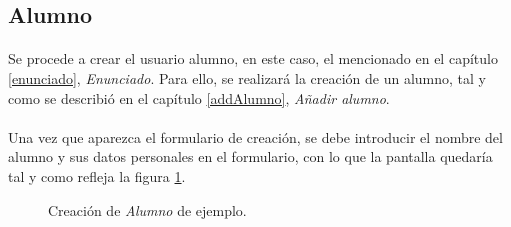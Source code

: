 \subsection{Alumno}

  \paragraph{}Se procede a crear el usuario alumno, en este caso, el mencionado
  en el capítulo \ref{enunciado}, \textit{Enunciado}. Para ello, se realizará la
  creación de un alumno, tal y como se describió en el capítulo \ref{addAlumno},
  \textit{Añadir alumno}.

  \paragraph{}Una vez que aparezca el formulario de creación, se debe introducir
  el nombre del alumno y sus datos personales en el formulario, con lo que
  la pantalla quedaría tal y como refleja la figura \ref{ejemploAddAlumno}.

  \begin{figure}[!ht]
    \begin{center}
      \caption{Creación de \textit{Alumno} de ejemplo.}
      \label{ejemploAddAlumno}
    \end{center}
  \end{figure}

